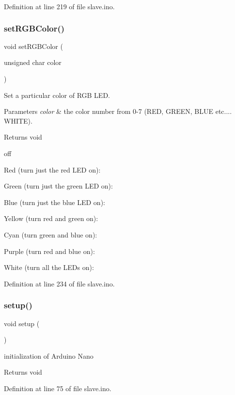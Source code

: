 Definition at line 219 of file slave.\+ino.

\mbox{\label{slave_8ino_a1838aedbd7c80d2e66f6edf920484f72}} 
\subsubsection{\texorpdfstring{setRGBColor()}{setRGBColor()}}
{\footnotesize\ttfamily void set\+R\+G\+B\+Color (\begin{DoxyParamCaption}\item[{unsigned char}]{color }\end{DoxyParamCaption})}



Set a particular color of R\+GB L\+ED. 


\begin{DoxyParams}{Parameters}
{\em color} & the color number from 0-\/7 (R\+ED, G\+R\+E\+EN, B\+L\+UE etc.... W\+H\+I\+TE). \\
\hline
\end{DoxyParams}
\begin{DoxyReturn}{Returns}
void 
\end{DoxyReturn}
off

Red (turn just the red L\+ED on)\+:

Green (turn just the green L\+ED on)\+:

Blue (turn just the blue L\+ED on)\+:

Yellow (turn red and green on)\+:

Cyan (turn green and blue on)\+:

Purple (turn red and blue on)\+:

White (turn all the L\+E\+Ds on)\+: 

Definition at line 234 of file slave.\+ino.

\mbox{\label{slave_8ino_a4fc01d736fe50cf5b977f755b675f11d}} 
\subsubsection{\texorpdfstring{setup()}{setup()}}
{\footnotesize\ttfamily void setup (\begin{DoxyParamCaption}{ }\end{DoxyParamCaption})}



initialization of Arduino Nano 

\begin{DoxyReturn}{Returns}
void 
\end{DoxyReturn}


Definition at line 75 of file slave.\+ino.

